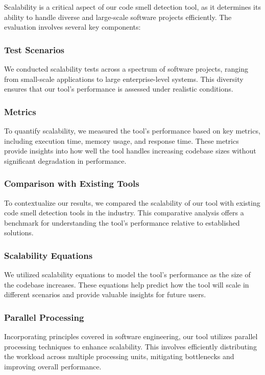 \documentclass[journal]{IEEEtran}
\begin{document}
Scalability is a critical aspect of our code smell detection tool, as it determines its ability to handle diverse and large-scale software projects efficiently. The evaluation involves several key components:

\subsubsection{Test Scenarios}

We conducted scalability tests across a spectrum of software projects, ranging from small-scale applications to large enterprise-level systems. This diversity ensures that our tool's performance is assessed under realistic conditions.

\subsubsection{Metrics}

To quantify scalability, we measured the tool's performance based on key metrics, including execution time, memory usage, and response time. These metrics provide insights into how well the tool handles increasing codebase sizes without significant degradation in performance.

\subsubsection{Comparison with Existing Tools}

To contextualize our results, we compared the scalability of our tool with existing code smell detection tools in the industry. This comparative analysis offers a benchmark for understanding the tool's performance relative to established solutions.

\subsubsection{Scalability Equations}

We utilized scalability equations to model the tool's performance as the size of the codebase increases. These equations help predict how the tool will scale in different scenarios and provide valuable insights for future users.

\subsubsection{Parallel Processing}

Incorporating principles covered in software engineering, our tool utilizes parallel processing techniques to enhance scalability. This involves efficiently distributing the workload across multiple processing units, mitigating bottlenecks and improving overall performance.
\end{document}
